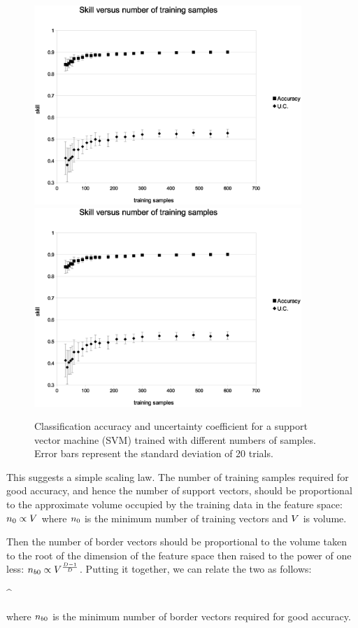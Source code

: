 \begin{figure}
  \ifsubmit
    \includegraphics[width=0.9\textwidth]{skill_v_nt}
  \else
    \includegraphics[width=0.9\textwidth]{../skill_v_nt}
  \fi
\caption{Classification accuracy and uncertainty coefficient for a support vector machine (SVM) trained with different numbers of samples.
Error bars represent the standard deviation of 20 trials.}
\label{skill_v_nt}
\end{figure}

This suggests a simple scaling law. The number of training samples required
for good accuracy, and hence the number of support vectors, 
should be proportional to the approximate volume occupied by the
training data in the feature space: $n_0 \propto V$ where 
$n_0$ is the minimum number of training vectors and $V$ is volume.
{\color{red} Then the number of border vectors should be proportional to the volume
taken to the root of the dimension of the feature space 
then raised to the power of one less:
$n_{b0} \propto V^\frac{D-1}{D}$.
Putting it together, we can relate the two as follows:
\begin{eqnnon}
	\minborders \propto \mintrain^
	\label{scaling_law}
\end{eqnnon}
}
where $n_{b0}$ is the minimum number of border vectors required for good
accuracy.

